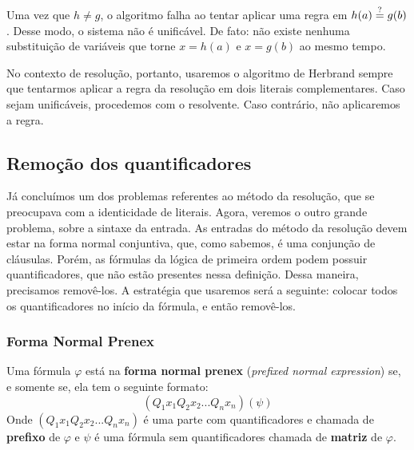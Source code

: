Uma vez que $h \neq g$, o algoritmo falha ao tentar aplicar uma regra em $h(a) \overset{?}{=} g(b)$. Desse modo, o sistema não é unificável. De fato: não existe nenhuma substituição de variáveis que torne $x = h(a)$ e $x = g(b)$ ao mesmo tempo. 

No contexto de resolução, portanto, usaremos o algoritmo de Herbrand sempre que tentarmos aplicar a regra da resolução em dois literais complementares. Caso sejam unificáveis, procedemos com o resolvente. Caso contrário, não aplicaremos a regra.

\subsection{Remoção dos quantificadores}
Já concluímos um dos problemas referentes ao método da resolução, que se preocupava com a identicidade de literais. Agora, veremos o outro grande problema, sobre a sintaxe da entrada. As entradas do método da resolução devem estar na forma normal conjuntiva, que, como sabemos, é uma conjunção de cláusulas. Porém, as fórmulas da lógica de primeira ordem podem possuir quantificadores, que não estão presentes nessa definição. Dessa maneira, precisamos removê-los. A estratégia que usaremos será a seguinte: colocar todos os quantificadores no início da fórmula, e então removê-los.

\subsubsection{Forma Normal Prenex}
Uma fórmula $\varphi$ está na \textbf{forma normal prenex} (\textit{prefixed normal expression}) se, e somente se, ela tem o seguinte formato:
\[(Q_1 x_1Q_2 x_2...Q_n x_n)(\psi)\]
Onde $(Q_1 x_1Q_2 x_2...Q_n x_n)$ é uma parte com quantificadores e chamada de \textbf{prefixo} de $\varphi$ e $\psi$ é uma fórmula sem quantificadores chamada de \textbf{matriz} de $\varphi$.

